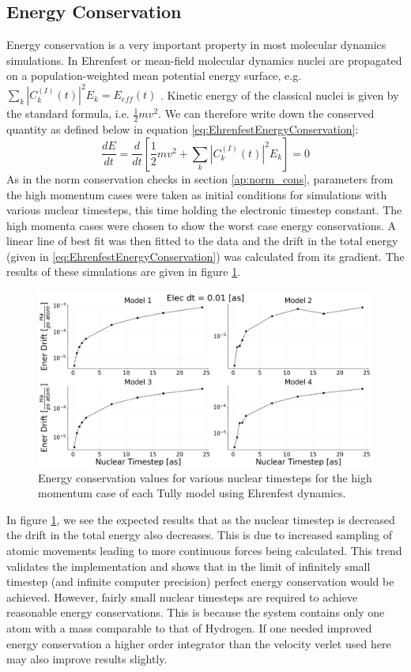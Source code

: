 \subsection{Energy Conservation}
Energy conservation is a very important property in most molecular dynamics simulations. In Ehrenfest or mean-field molecular dynamics nuclei are propagated on a population-weighted mean potential energy surface, e.g. $\sum_{k}|C_{k}^{(I)}(t)|^2 E_{k} = E_{eff}(t)$ \cite{EhrenEnerCons}. Kinetic energy of the classical nuclei is given by the standard formula, i.e. $\frac{1}{2} m v^2$. We can therefore write down the conserved quantity as defined below in equation \eqref{eq:EhrenfestEnergyConservation}:
\begin{equation}
	\frac{d E}{dt} = \frac{d}{dt} \left[ \frac{1}{2} m v^2 + \sum_{k}|C_{k}^{(I)}(t)|^2 E_{k}\right] = 0
  \label{eq:EhrenfestEnergyConservation}
\end{equation}
As in the norm conservation checks in section \ref{ap:norm_cons},  parameters from the high momentum cases were taken as initial conditions for simulations with various nuclear timesteps, this time holding the electronic timestep constant. The high momenta cases were chosen to show the worst case energy conservations. A linear line of best fit was then fitted to the data and the drift in the total energy (given in \eqref{eq:EhrenfestEnergyConservation}) was calculated from its gradient. The results of these simulations are given in figure \ref{fig:EhrenEnerCons}.
\begin{figure}[ht]
  \includegraphics[width=\textwidth]{../img/CTMQC/TullyModels/Ehren_EnerCons.png}
  \caption{\label{fig:EhrenEnerCons}Energy conservation values for various nuclear timesteps for the high momentum case of each Tully model using Ehrenfest dynamics.}
\end{figure}
In figure \ref{fig:EhrenEnerCons}, we see the expected results that as the nuclear timestep is decreased the drift in the total energy also decreases. This is due to increased sampling of atomic movements leading to more continuous forces being calculated. This trend validates the implementation and shows that in the limit of infinitely small timestep (and infinite computer precision) perfect energy conservation would be achieved. However, fairly small nuclear timesteps are required to achieve reasonable energy conservations. This is because the system contains only one atom with a mass comparable to that of Hydrogen. If one needed  improved energy conservation a higher order integrator than the velocity verlet used here may also improve results slightly.

